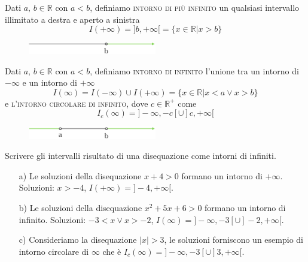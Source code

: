 \begin{definizione}
  Dati \(a,\,b\in\mathbb{R}\) con \(a<b\), definiamo \textsc{intorno di più 
infinito} un qualsiasi intervallo illimitato a destra e aperto a sinistra
\begin{equation}
  I(+\infty)=]b,+\infty[=\{x\in\mathbb{R}\vert x>b\}
\end{equation}
\end{definizione}

\begin{figure}[htpb!]
  \centering
  \includegraphics[width=0.5\textwidth]{img/top_5.png}%
\end{figure}

\begin{definizione}
  Dati \(a,\,b\in\mathbb{R}\) con \(a<b\), definiamo \textsc{intorno di 
infinito} l'unione tra un intorno di \(-\infty\)  e un intorno di \(+\infty\) 
\begin{equation}
  I(\infty)=I(-\infty)\cup I(+\infty)=\{x\in\mathbb{R}\vert x<a \lor 
x>b\}
\end{equation}
e \textsc{l'intorno circolare di infinito}, dove \(c\in\mathbb{R}^+\) come
\begin{equation}
  I_c(\infty)=]-\infty,-c[\cup]c,+\infty[
\end{equation}
\end{definizione}

\begin{figure}[htpb!]
  \centering
  \includegraphics[width=0.5\textwidth]{img/top_6.png}%
\end{figure}


\begin{esempio} Scrivere gli intervalli risultato di una disequazione come 
intorni di infiniti.
\begin{itemize}
  \item[a)] Le soluzioni della disequazione \(x+4>0\) formano un intorno 
di \(+\infty\).  Soluzioni: \(x>-4\), \(I(+\infty)=]-4, +\infty[\).\\
  \item[b)] Le soluzioni della disequazione \(x^2+5x+6>0\) formano un 
intorno di infinito. Soluzioni: \(-3<x\lor x>-2\), \(I(\infty)=]-\infty, -3[ 
\cup]-2, +\infty[\).\\
  \item[c)] Consideriamo la disequazione \(\vert x\vert>3\), le soluzioni 
forniscono un esempio di intorno circolare di \(\infty\) che è 
\(I_c(\infty)=]-\infty,-3[\cup]3,+\infty[\).
\end{itemize} 
\end{esempio}

